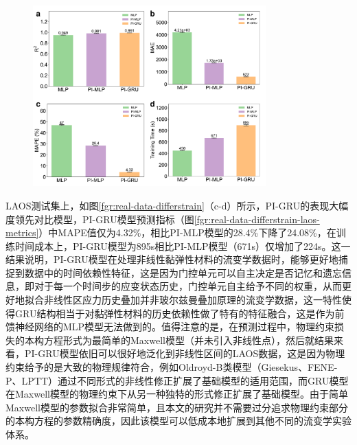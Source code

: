 \begin{figure}
  \centering
  \includegraphics[width=0.8\textwidth]{Fig/real-data-differstrain-laos-metrics.pdf} %
\end{figure}
LAOS测试集上，如图\ref{fgr:real-data-differstrain}（c-d）所示，PI-GRU的表现大幅度领先对比模型，PI-GRU模型预测指标（图\ref{fgr:real-data-differstrain-laos-metrics}）中MAPE值仅为4.32\%，相比PI-MLP模型的28.4\%下降了24.08\%，在训练时间成本上，PI-GRU模型为895s相比PI-MLP模型（671s）仅增加了224s。这一结果说明，PI-GRU模型在处理非线性黏弹性材料的流变学数据时，能够更好地捕捉到数据中的时间依赖性特征，这是因为门控单元可以自主决定是否记忆和遗忘信息，即对于每一个时间步的应变状态历史，门控单元自主给予不同的权重，从而更好地拟合非线性区应力历史叠加并非玻尔兹曼叠加原理的流变学数据，这一特性使得GRU结构相当于对黏弹性材料的历史依赖性做了特有的特征融合，这是作为前馈神经网络的MLP模型无法做到的。值得注意的是，在预测过程中，物理约束损失的本构方程形式为最简单的Maxwell模型（并未引入非线性点），然后就结果来看，PI-GRU模型依旧可以很好地泛化到非线性区间的LAOS数据，这是因为物理约束给予的是大致的物理规律符合，例如Oldroyd-B类模型（Giesekus、FENE-P、​LPTT）通过不同形式的非线性修正扩展了基础模型的适用范围，而GRU模型在Maxwell模型的物理约束下从另一种独特的形式修正扩展了基础模型。由于简单Maxwell模型的参数拟合非常简单，且本文的研究并不需要过分追求物理约束部分的本构方程的参数精确度，因此该模型可以低成本地扩展到其他不同的流变学实验体系。
